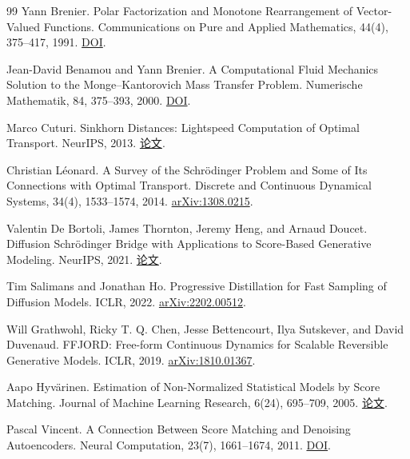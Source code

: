 \begin{thebibliography}{99}
Yann Brenier.
\newblock Polar Factorization and Monotone Rearrangement of Vector-Valued Functions.
\newblock Communications on Pure and Applied Mathematics, 44(4), 375--417, 1991.
\href{https://doi.org/10.1002/cpa.3160440402}{DOI}.

Jean-David Benamou and Yann Brenier.
\newblock A Computational Fluid Mechanics Solution to the Monge--Kantorovich
Mass Transfer Problem.
\newblock Numerische Mathematik, 84, 375--393, 2000.
\href{https://doi.org/10.1007/s002110050002}{DOI}.

Marco Cuturi.
\newblock Sinkhorn Distances: Lightspeed Computation of Optimal Transport.
\newblock NeurIPS, 2013.
\href{https://proceedings.neurips.cc/paper_files/paper/2013/hash/af21d0c97db2e27e13572cbf59eb343d-Abstract.html}{论文}.

Christian Léonard.
\newblock A Survey of the Schrödinger Problem and Some of Its Connections
with Optimal Transport.
\newblock Discrete and Continuous Dynamical Systems, 34(4), 1533--1574, 2014.
\href{https://arxiv.org/abs/1308.0215}{arXiv:1308.0215}.

Valentin De Bortoli, James Thornton, Jeremy Heng, and Arnaud Doucet.
\newblock Diffusion Schrödinger Bridge with Applications to Score-Based
Generative Modeling.
\newblock NeurIPS, 2021.
\href{https://proceedings.neurips.cc/paper/2021/hash/940392f5f32a7ade1cc201767cf83e31-Abstract.html}{论文}.

Tim Salimans and Jonathan Ho.
\newblock Progressive Distillation for Fast Sampling of Diffusion Models.
\newblock ICLR, 2022.
\href{https://arxiv.org/abs/2202.00512}{arXiv:2202.00512}.

Will Grathwohl, Ricky T. Q. Chen, Jesse Bettencourt, Ilya Sutskever,
and David Duvenaud.
\newblock FFJORD: Free-form Continuous Dynamics for Scalable Reversible
Generative Models.
\newblock ICLR, 2019.
\href{https://arxiv.org/abs/1810.01367}{arXiv:1810.01367}.

Aapo Hyvärinen.
\newblock Estimation of Non-Normalized Statistical Models by Score Matching.
\newblock Journal of Machine Learning Research, 6(24), 695--709, 2005.
\href{https://www.jmlr.org/papers/v6/hyvarinen05a.html}{论文}.

Pascal Vincent.
\newblock A Connection Between Score Matching and Denoising Autoencoders.
\newblock Neural Computation, 23(7), 1661--1674, 2011.
\href{https://doi.org/10.1162/NECO_a_00142}{DOI}.


\end{thebibliography}
